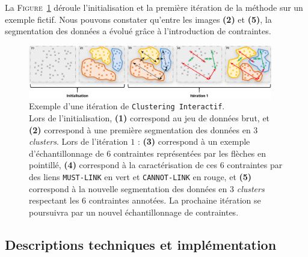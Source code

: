 		\begin{leftBarExamples}
			La \textsc{Figure~\ref{figure:3.2.2-DESCRIPTION-THEORIQUE-DETAILLEE-EXEMPLE}} déroule l'initialisation et la première itération de la méthode sur un exemple fictif.
			Nous pouvons constater qu'entre les images \textbf{(2)} et \textbf{(5)}, la segmentation des données a évolué grâce à l'introduction de contraintes.
		
			\begin{figure}[H]
				\centering
				\includegraphics[width=0.95\textwidth]{figures/example-iteration-clustering-interatif}
				\caption{
					Exemple d'une itération de \texttt{Clustering Interactif}. \\
					Lors de l'initialisation,
					\textbf{(1)} correspond au jeu de données brut,
					et \textbf{(2)} correspond à une première segmentation des données en $3$ \textit{clusters}.
					Lors de l'itération $1$ :
					\textbf{(3)} correspond à un exemple d'échantillonnage de $6$ contraintes représentées par les flèches en pointillé,
					\textbf{(4)} correspond à la caractérisation de ces $6$ contraintes par des liens \texttt{MUST-LINK} en vert et \texttt{CANNOT-LINK} en rouge,
					et \textbf{(5)} correspond à la nouvelle segmentation des données en $3$ \textit{clusters} respectant les $6$ contraintes annotées.
					La prochaine itération se poursuivra par un nouvel échantillonnage de contraintes.
				}
				\label{figure:3.2.2-DESCRIPTION-THEORIQUE-DETAILLEE-EXEMPLE}
			\end{figure}
		\end{leftBarExamples}
	
	
	\subsection{Descriptions techniques et implémentation}
	\label{section:3.2.3-DESCRIPTION-TECHNIQUE-IMPLEMENTATION}
	
